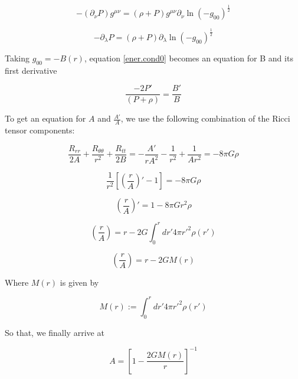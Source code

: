 \begin{equation}
-(\partial_\nu P) g^{\mu \nu} = (\rho+ P) g^{\mu \nu} \partial_\nu \ln{(-g_{00})^{\frac{1}{2}}}
\end{equation}

\begin{equation}\label{ener.cond0}
-\partial_\lambda P  = (\rho+ P)  \partial_\lambda \ln{(-g_{00})^{\frac{1}{2}}}
\end{equation}

Taking $g_{00} = -B(r)$, equation \ref{ener.cond0} becomes an equation for B and its first derivative

\begin{equation}\label{B'/B}
\frac{-2P'}{(P+\rho)} = \frac{B'}{B}
\end{equation}


To get an equation for $A$ and $\frac{A'}{A}$, we use the following combination of the Ricci tensor components:

\begin{equation}
\frac{R_{rr}}{2A} +\frac{R_{\theta \theta}}{r^2} + \frac{R_{tt}}{2B} = -\frac{A'}{rA^2} - \frac{1}{r^2} + \frac{1}{A r^2} = -8\pi G \rho
\end{equation}

\begin{equation}
\frac{1}{r^2} \left[ \left(\frac{r}{A} \right)' - 1 \right] = -8\pi G \rho
\end{equation}

\begin{equation}
 \left(\frac{r}{A}\right)' = 1 - 8\pi G r^2 \rho
\end{equation}

\begin{equation}
\left(\frac{r}{A}\right) = r - 2G \int_0^r dr'4\pi  r'^2 \rho(r')
\end{equation}

\begin{equation}
\left(\frac{r}{A}\right) = r - 2G M(r)
\end{equation}

Where $M(r)$ is given by

\begin{equation}\label{oreijf}
M(r):= \int_0^r dr'4\pi  r'^2 \rho(r')
\end{equation}


So that, we finally arrive at 

\begin{equation}\label{A}
A = \left[ 1 - \frac{2G M(r)}{r} \right]^{-1}
\end{equation}

